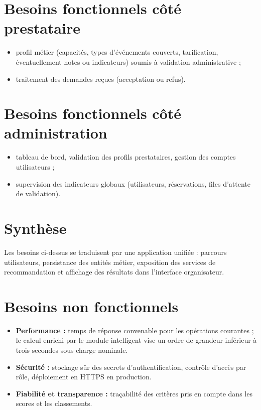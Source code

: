 \documentclass[a4paper,12pt]{report}
\begin{document}
\section{Besoins fonctionnels côté prestataire}

\begin{itemize}[leftmargin=*]
  \item profil métier (capacités, types d'événements couverts, tarification, éventuellement notes ou indicateurs) soumis à validation administrative ;
  \item traitement des demandes reçues (acceptation ou refus).
\end{itemize}

\section{Besoins fonctionnels côté administration}

\begin{itemize}[leftmargin=*]
  \item tableau de bord, validation des profils prestataires, gestion des comptes utilisateurs ;
  \item supervision des indicateurs globaux (utilisateurs, réservations, files d'attente de validation).
\end{itemize}

\section{Synthèse}

Les besoins ci-dessus se traduisent par une application unifiée : parcours utilisateurs, persistance des entités métier, exposition des services de recommandation et affichage des résultats dans l'interface organisateur.

\section{Besoins non fonctionnels}

\begin{itemize}[leftmargin=*]
  \item \textbf{Performance :} temps de réponse convenable pour les opérations courantes ; le calcul enrichi par le module intelligent vise un ordre de grandeur inférieur à trois secondes sous charge nominale.
  \item \textbf{Sécurité :} stockage sûr des secrets d'authentification, contrôle d'accès par rôle, déploiement en HTTPS en production.
  \item \textbf{Fiabilité et transparence :} traçabilité des critères pris en compte dans les scores et les classements.
\end{itemize}
\end{document}
